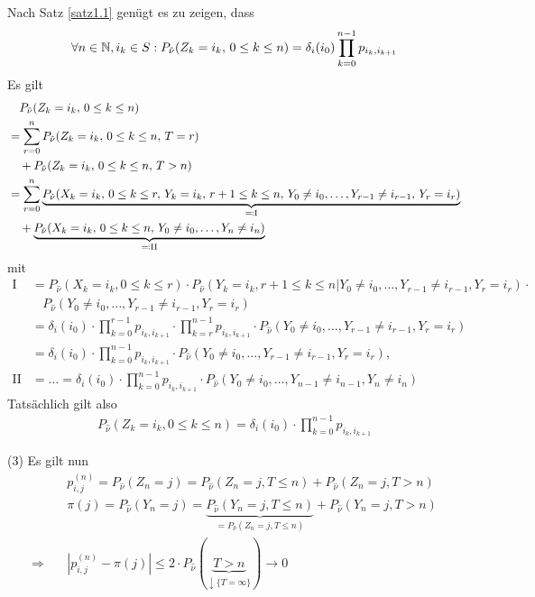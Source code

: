 \documentclass[a4paper,twoside,DIV15,BCOR12mm]{scrbook}
\begin{document}
\begin{beweis}
Nach Satz \ref{satz1.1} genügt es zu zeigen, dass
\[\forall n\in\mathbb{N}, i_k\in S: P_{\hat\nu}(Z_k=i_k,\, 0\le k\le n) = \delta_i(i_0) \prod_{k=0}^{n-1}p_{i_k,i_{k+1}}\]
Es gilt
\begin{align*}
&\quad P_{\hat \nu}(Z_k=i_k,\,0\le k\le n)\\
&= \sum_{r=0}^n P_{\hat \nu}(Z_k=i_k,\, 0\le k\le n,\, T=r)\\
&\quad + P_{\hat \nu}(Z_k = i_k,\, 0\le k \le n,\, T>n) \\
&= \sum_{r=0}^n \underbrace{P_{\hat \nu}(X_k = i_k,\, 0\le k\le r,\, Y_k=i_k,\, r+1\le k\le n,\, Y_0\ne i_0,\ldots, Y_{r-1}\ne i_{r-1},\, Y_r=i_r)}_{\ad \text{I}} \\
&\quad + \underbrace{P_{\hat \nu}(X_k = i_k, \, 0\le k\le n,\, Y_0\ne i_0,\ldots,Y_n\ne i_n)}_{\ad \text{II}}
\end{align*}
mit
\begin{align*}
  \text{I} &= P_{\hat \nu}(X_k = i_k, 0 \leq k \leq r) \cdot P_{\hat \nu}(Y_k = i_k, r+1 \leq k \leq n | Y_0 \neq i_0, \ldots, Y_{r-1} \neq i_{r-1}, Y_r = i_r) \cdot\\
           &~~~~ P_{\hat \nu}(Y_0 \neq i_0, \ldots, Y_{r-1} \neq i_{r-1}, Y_r = i_r)\\
           &= \delta_i(i_0) \cdot \prod_{k=0}^{r-1} p_{i_k,i_{k+1}} \cdot \prod_{k=r}^{n-1} p_{i_k,i_{k+1}} \cdot P_{\hat \nu}(Y_0 \neq i_0, \ldots, Y_{r-1} \neq i_{r-1}, Y_r = i_r)\\
           &= \delta_i(i_0) \cdot \prod_{k=0}^{n-1} p_{i_k,i_{k+1}} \cdot P_{\hat \nu}(Y_0 \neq i_0, \ldots, Y_{r-1} \neq i_{r-1}, Y_r = i_r),\\
  \text{II} &= \ldots = \delta_i(i_0) \cdot \prod_{k=0}^{n-1} p_{i_k,i_{k+1}} \cdot P_{\hat \nu}(Y_0 \neq i_0, \ldots, Y_{n-1} \neq i_{n-1}, Y_n \neq i_n)
\end{align*}
Tatsächlich gilt also
\begin{align*}
  P_{\hat \nu}(Z_k=i_k, 0 \leq k \leq n) = \delta_i(i_0) \cdot \prod_{k=0}^{n-1} p_{i_k,i_{k+1}}
\end{align*}

(3) Es gilt nun
\begin{align*}
    &p_{i,j}^{(n)} = P_{\hat \nu}(Z_n = j) = P_{\hat \nu}(Z_n = j, T \leq n) + P_{\hat \nu}(Z_n = j, T > n)\\
    &\pi(j) = P_{\hat \nu}(Y_n = j) = \underbrace{P_{\hat \nu}(Y_n = j, T \leq n)}_{= P_{\hat \nu}(Z_n = j, T \leq n)} + P_{\hat \nu}(Y_n = j, T > n)\\
  \Rightarrow \quad &|p_{i,j}^{(n)} - \pi(j)| \leq 2 \cdot P_{\hat \nu}(\underbrace{T > n}_{\downarrow \{T = \infty\}}) \longrightarrow 0
\end{align*}
\end{beweis}
\end{document}
